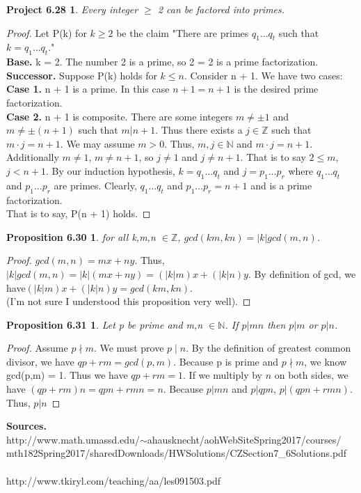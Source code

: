 \documentclass[12pt]{amsart}
\newcommand{\N}{\mathbb{N}}
\newcommand{\Z}{\mathbb{Z}}
\begin{document}
\newtheorem*{proj6.28}{Project 6.28}
\begin{proj6.28}
	Every integer $\geq$ 2 can be factored into primes.
\end{proj6.28}
\begin{proof}
	Let P(k) for $k \geq 2$ be the claim "There are primes $q_{1}\dots q_{t}$ such that $k = q_{1}\dots q_{t}$."
	\\\textbf{Base.} k = 2. The number 2 is a prime, so 2 = 2 is a prime factorization.
	\\\textbf{Successor.} Suppose P(k) holds for $k \leq n$. Consider n + 1. We have two cases: 
	\\\textbf{Case 1.} n + 1 is a prime. In this case $n + 1 = n + 1$ is the desired prime factorization.
	\\\textbf{Case 2.} n + 1 is composite. There are some integers $m \neq \pm 1$ and $m \neq \pm (n+1)$ such that $m | n+1$. Thus there exists a $j \in \Z$ such that $m \cdot j = n + 1$. We may assume $m > 0$. Thus, $m,j \in \N$ and $m \cdot j = n + 1$. Additionally $m \neq 1$, $m \neq n + 1$, so $j \neq 1$ and $j \neq n + 1$. That is to say $2 \leq m$, $j < n + 1$. By our induction hypothesis, $k = q_{1}\dots q_{t}$ and $j = p_{1} \dots p_{r}$ where $q_{1}\dots q_{t}$ and $p_{1} \dots p_{r}$ are primes. Clearly, $q_{1} \dots q_{t}$ and $p_{1} \dots p_{r} = n + 1$ and is a prime factorization. \\That is to say, P(n + 1) holds.
\end{proof}

\newtheorem*{prop6.30}{Proposition 6.30}
\begin{prop6.30}
	for all k,m,n $\in \Z$, \center$gcd(km,kn) = |k|gcd(m,n)$.
\end{prop6.30}

\begin{proof}
	$gcd(m,n) = mx + ny$. Thus, $|k|gcd(m,n) = |k|(mx +ny) = (|k|m)x + (|k|n)y$. By definition of gcd, we have$(|k|m)x + (|k|n)y = gcd(km,kn)$.\\ (I'm not sure I understood this proposition very well).
\end{proof}

\newtheorem*{prop6.31}{Proposition 6.31}
\begin{prop6.31}
	Let p be prime and m,n $\in \N$. If $p | mn$ then
$p | m$ or $p | n$.
\end{prop6.31}

\begin{proof}
	Assume $p \nmid m$. We must prove $p \mid n$. By the definition of greatest common divisor, we have $qp + rm = gcd(p,m)$. Because p is prime and $p \nmid m$, we know gcd(p,m) = 1. Thus we have $qp + rm = 1$. If we multiply by $n$ on both sides, we have $(qp + rm)n = qpn + rmn = n$. Because $p | mn$ and $p | qpn$, $p | (qpn + rmn)$. Thus, $p | n$
\end{proof}

\noindent\textbf{Sources.}
\\http://www.math.umassd.edu/$\sim$ahausknecht/aohWebSiteSpring2017/courses/\\mth182Spring2017/sharedDownloads/HWSolutions/CZSection7\_6Solutions.pdf
\\
\\http://www.tkiryl.com/teaching/aa/les091503.pdf
\end{document}
